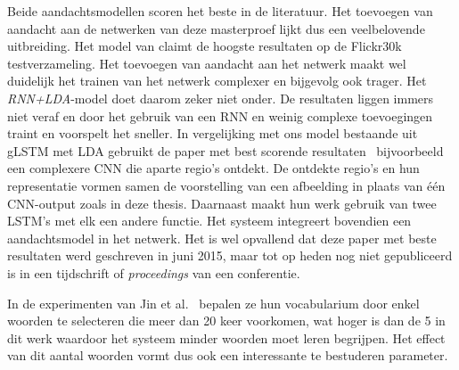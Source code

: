 Beide aandachtsmodellen scoren het beste in de literatuur. Het toevoegen van aandacht aan de netwerken van deze masterproef lijkt dus een veelbelovende uitbreiding.
Het model van \cite{Jin2015} claimt de hoogste resultaten op de Flickr30k testverzameling.
Het toevoegen van aandacht aan het netwerk maakt wel duidelijk het trainen van het netwerk complexer en bijgevolg ook trager.
Het \emph{RNN+LDA}-model doet daarom zeker niet onder. De resultaten liggen immers niet veraf en door het gebruik van een RNN en weinig complexe toevoegingen traint en voorspelt het sneller.
In vergelijking met ons model bestaande uit gLSTM met LDA gebruikt de paper met best scorende resultaten~\cite{Jin2015} bijvoorbeeld een complexere CNN die aparte regio's ontdekt. De ontdekte regio's en hun representatie vormen samen de voorstelling van een afbeelding in plaats van \'e\'en CNN-output zoals in deze thesis. Daarnaast maakt hun werk gebruik van twee LSTM's met elk een andere functie. Het systeem integreert bovendien een aandachtsmodel in het netwerk.
Het is wel opvallend dat deze paper met beste resultaten werd geschreven in juni 2015, maar tot op heden nog niet gepubliceerd is in een tijdschrift of \emph{proceedings} van een conferentie.

In de experimenten van Jin et al.~\cite{Jin2015} bepalen ze hun vocabularium door enkel woorden te selecteren die meer dan 20 keer voorkomen, wat hoger is dan de 5 in dit werk waardoor het systeem minder woorden moet leren begrijpen. Het effect van dit aantal woorden vormt dus ook een interessante te bestuderen parameter.

